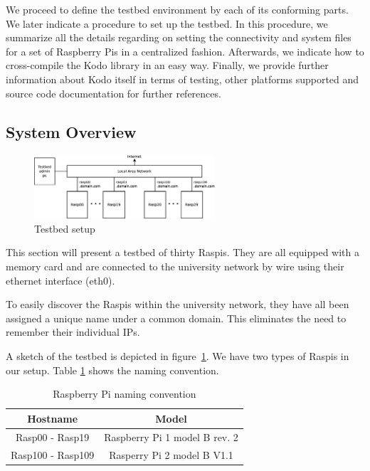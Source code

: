 \label{sec:testbed}

We proceed to define the testbed environment by each of its conforming
parts. We later indicate a procedure to set up the testbed. In this procedure,
we summarize all the details regarding on setting the connectivity and
system files for a set of Raspberry Pis in a centralized fashion.
Afterwards, we indicate how to cross-compile the Kodo library in an
easy way. Finally, we provide further information about Kodo itself in terms
of testing, other platforms supported and source code documentation
for further references.

\subsection{System Overview}


\begin{figure}[ht!]
\centering
\includegraphics[width=0.6\textwidth]{images/testbed_setup2.eps}
\caption{Testbed setup}
\label{fig:testbed_setup}
\end{figure}

This section will present a testbed of thirty \ac{Raspi}s.
They are all equipped with a memory card and are connected to the
university network by wire using their ethernet interface (eth0).

To easily discover the \ac{Raspi}s within the university network, they have all
been assigned a unique name under a common domain.
This eliminates the need to remember their individual \ac{IP}s.

A sketch of the testbed is depicted in figure~\ref{fig:testbed_setup}.
We have two types of \ac{Raspi}s in our setup.
Table \ref{tab:rasp_naming} shows the naming convention.

\begin{table}[ht!]
  \centering
  \begin{tabular}{|c|c|}
    \hline
      \textbf{Hostname} & \textbf{Model} \\ \hline
    Rasp00 - Rasp19 & Raspberry Pi 1 model B rev. 2 \\ \hline
    Rasp100 - Rasp109 & Rasperry Pi 2 model B V1.1 \\ \hline
  \end{tabular}
  \caption{Raspberry Pi naming convention}
  \label{tab:rasp_naming}
\end{table}




